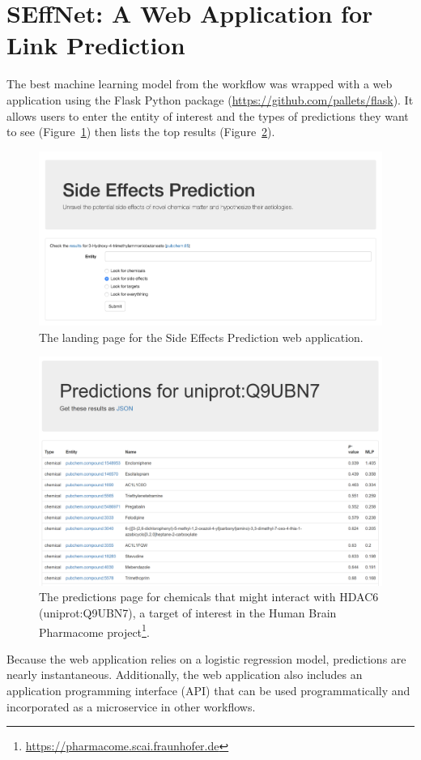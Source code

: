 \section{SEffNet: A Web Application for Link Prediction}

The best machine learning model from the workflow was wrapped with a web application using the Flask Python package (\url{https://github.com/pallets/flask}).
It allows users to enter the entity of interest and the types of predictions they want to see (Figure~\ref{fig:web_page}) then lists the top results (Figure~\ref{fig:protein_prediction}).

\begin{figure}[h!]
    \centering
    \includegraphics[scale=0.35]
    {figures/web_page.png}
    \caption{\label{fig:web_page} The landing page for the Side Effects Prediction web application.}
\end{figure}

\begin{figure}[h!]
    \centering
    \includegraphics[scale=0.5]
    {figures/protein_prediction.png}
    \caption[The predictions page for chemicals interacting with HDAC6]{\label{fig:protein_prediction} The predictions page for chemicals that might interact with HDAC6 (uniprot:Q9UBN7), a target of interest in the Human Brain Pharmacome project\footnote{\url{https://pharmacome.scai.fraunhofer.de}}.}
\end{figure}

Because the web application relies on a logistic regression model, predictions are nearly instantaneous.
Additionally, the web application also includes an application programming interface (API) that can be used programmatically and incorporated as a microservice in other workflows.
